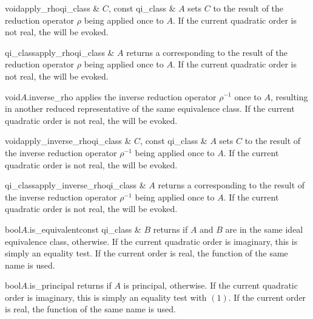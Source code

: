 \begin{fcode}{void}{apply_rho}{qi_class & $C$, const qi_class & $A$}
  sets $C$ to the result of the reduction operator $\rho$ being applied once to $A$.  If the
  current quadratic order is not real, the \LEH will be evoked.
\end{fcode}

\begin{fcode}{qi_class}{apply_rho}{qi_class & $A$}
  returns a  corresponding to the result of the reduction operator $\rho$ being
  applied once to $A$.  If the current quadratic order is not real, the \LEH will be evoked.
\end{fcode}

\begin{fcode}{void}{$A$.inverse_rho}{}
  applies the inverse reduction operator $\rho^{-1}$ once to $A$, resulting in another reduced
  representative of the same equivalence class.  If the current quadratic order is not real, the
  \LEH will be evoked.
\end{fcode}

\begin{fcode}{void}{apply_inverse_rho}{qi_class & $C$, const qi_class & $A$}
  sets $C$ to the result of the inverse reduction operator $\rho^{-1}$ being applied once to $A$.
  If the current quadratic order is not real, the \LEH will be evoked.
\end{fcode}

\begin{fcode}{qi_class}{apply_inverse_rho}{qi_class & $A$}
  returns a  corresponding to the result of the inverse reduction operator
  $\rho^{-1}$ being applied once to $A$.  If the current quadratic order is not real, the \LEH
  will be evoked.
\end{fcode}




\begin{cfcode}{bool}{$A$.is_equivalent}{const qi_class & $B$}
  returns \TRUE if $A$ and $B$ are in the same ideal equivalence class, \FALSE otherwise.  If
  the current quadratic order is imaginary, this is simply an equality test.  If the current
  order is real, the  function of the same name is used.
\end{cfcode}

\begin{cfcode}{bool}{$A$.is_principal}{}
  returns \TRUE if $A$ is principal, \FALSE otherwise.  If the current quadratic order is
  imaginary, this is simply an equality test with $(1)$.  If the current order is real, the
   function of the same name is used.
\end{cfcode}


